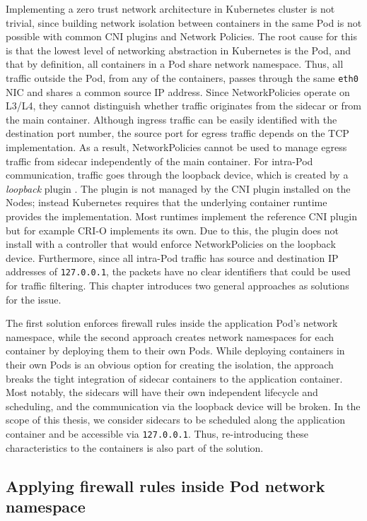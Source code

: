 \documentclass[english, 12pt, a4paper, sci, utf8, a-2b, online]{aaltothesis}
\begin{document}
Implementing a zero trust network architecture in Kubernetes cluster is not trivial, since building network isolation between containers in the same Pod is not possible with common CNI plugins and Network Policies.
The root cause for this is that the lowest level of networking abstraction in Kubernetes is the Pod, and that by definition, all containers in a Pod share network namespace.
Thus, all traffic outside the Pod, from any of the containers, passes through the same \texttt{eth0} NIC and shares a common source IP address.
Since NetworkPolicies operate on L3/L4, they cannot distinguish whether traffic originates from the sidecar or from the main container.
Although ingress traffic can be easily identified with the destination port number, the source port for egress traffic depends on the TCP implementation.
As a result, NetworkPolicies cannot be used to manage egress traffic from sidecar independently of the main container.
For intra-Pod communication, traffic goes through the loopback device, which is created by a \emph{loopback} plugin \cite{k8s-docs-cni}.
The plugin is not managed by the CNI plugin installed on the Nodes; instead Kubernetes requires that the underlying container runtime provides the implementation.
Most runtimes implement the reference CNI plugin \cite{cni-loopback} but for example CRI-O implements its own.
Due to this, the plugin does not install with a controller that would enforce NetworkPolicies on the loopback device.
Furthermore, since all intra-Pod traffic has source and destination IP addresses of \texttt{127.0.0.1}, the packets have no clear identifiers that could be used for traffic filtering.
This chapter introduces two general approaches as solutions for the issue.

The first solution enforces firewall rules inside the application Pod's network namespace, while the second approach creates network namespaces for each container by deploying them to their own Pods.
While deploying containers in their own Pods is an obvious option for creating the isolation, the approach breaks the tight integration of sidecar containers to the application container.
Most notably, the sidecars will have their own independent lifecycle and scheduling, and the communication via the loopback device will be broken.
In the scope of this thesis, we consider sidecars to be scheduled along the application container and be accessible via \texttt{127.0.0.1}.
Thus, re-introducing these characteristics to the containers is also part of the solution.

\subsection{Applying firewall rules inside Pod network namespace}
\end{document}
